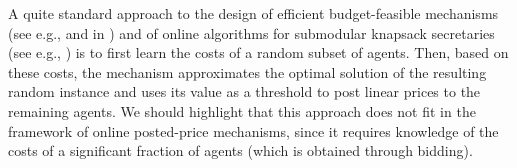 A quite standard approach to the design of efficient budget-feasible mechanisms (see e.g., \cite[Section~5]{Bada2012} and in 
\cite[Section~4]{AmanatidisKS22}) and of online algorithms for submodular knapsack secretaries (see e.g., \cite{FeldmanNS11}) is to first learn the costs of a random subset of agents. Then, based on these costs, the mechanism approximates the optimal solution of the resulting random instance and uses its value as a threshold to post linear prices to the remaining agents. We should highlight that this approach does not fit in the framework of online posted-price mechanisms, since it requires knowledge of the costs of a significant fraction of agents (which is obtained through bidding). 